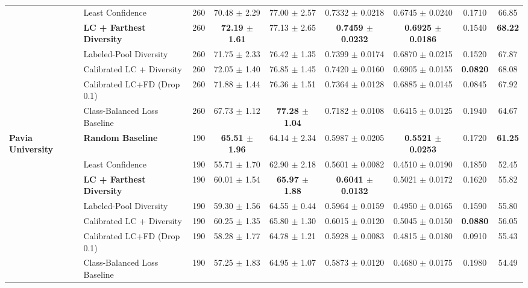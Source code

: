\documentclass[conference,letterpaper]{IEEEtran}
\begin{document}
\begin{table}[!t]
{\begin{tabular}{|l|l|c|c|c|c|c|c|c|}
& Least Confidence & 260 & 70.48 $\pm$ 2.29 & 77.00 $\pm$ 2.57 & 0.7332 $\pm$ 0.0218 & 0.6745 $\pm$ 0.0240 & 0.1710 & 66.85 \\
\cline{2-9}
& \textbf{LC + Farthest Diversity} & 260 & \textbf{72.19 $\pm$ 1.61} & 77.13 $\pm$ 2.65 & \textbf{0.7459 $\pm$ 0.0232} & \textbf{0.6925 $\pm$ 0.0186} & 0.1540 & \textbf{68.22} \\
\cline{2-9}
& Labeled-Pool Diversity & 260 & 71.75 $\pm$ 2.33 & 76.42 $\pm$ 1.35 & 0.7399 $\pm$ 0.0174 & 0.6870 $\pm$ 0.0215 & 0.1520 & 67.87 \\
\cline{2-9}
& Calibrated LC + Diversity & 260 & 72.05 $\pm$ 1.40 & 76.85 $\pm$ 1.45 & 0.7420 $\pm$ 0.0160 & 0.6905 $\pm$ 0.0155 & \textbf{0.0820} & 68.08 \\
\cline{2-9}
& Calibrated LC+FD (Drop 0.1) & 260 & 71.88 $\pm$ 1.44 & 76.36 $\pm$ 1.51 & 0.7364 $\pm$ 0.0128 & 0.6885 $\pm$ 0.0145 & 0.0845 & 67.92 \\
\cline{2-9}
& Class-Balanced Loss Baseline & 260 & 67.73 $\pm$ 1.12 & \textbf{77.28 $\pm$ 1.04} & 0.7182 $\pm$ 0.0108 & 0.6415 $\pm$ 0.0125 & 0.1940 & 64.67 \\
\hline
\hline
\multirow{7}{*}{\textbf{Pavia University}} 
& \textbf{Random Baseline} & 190 & \textbf{65.51 $\pm$ 1.96} & 64.14 $\pm$ 2.34 & 0.5987 $\pm$ 0.0205 & \textbf{0.5521 $\pm$ 0.0253} & 0.1720 & \textbf{61.25} \\
\cline{2-9}
& Least Confidence & 190 & 55.71 $\pm$ 1.70 & 62.90 $\pm$ 2.18 & 0.5601 $\pm$ 0.0082 & 0.4510 $\pm$ 0.0190 & 0.1850 & 52.45 \\
\cline{2-9}
& \textbf{LC + Farthest Diversity} & 190 & 60.01 $\pm$ 1.54 & \textbf{65.97 $\pm$ 1.88} & \textbf{0.6041 $\pm$ 0.0132} & 0.5021 $\pm$ 0.0172 & 0.1620 & 55.82 \\
\cline{2-9}
& Labeled-Pool Diversity & 190 & 59.30 $\pm$ 1.56 & 64.55 $\pm$ 0.44 & 0.5964 $\pm$ 0.0159 & 0.4950 $\pm$ 0.0165 & 0.1590 & 55.80 \\
\cline{2-9}
& Calibrated LC + Diversity & 190 & 60.25 $\pm$ 1.35 & 65.80 $\pm$ 1.30 & 0.6015 $\pm$ 0.0120 & 0.5045 $\pm$ 0.0150 & \textbf{0.0880} & 56.05 \\
\cline{2-9}
& Calibrated LC+FD (Drop 0.1) & 190 & 58.28 $\pm$ 1.77 & 64.78 $\pm$ 1.21 & 0.5928 $\pm$ 0.0083 & 0.4815 $\pm$ 0.0180 & 0.0910 & 55.43 \\
\cline{2-9}
& Class-Balanced Loss Baseline & 190 & 57.25 $\pm$ 1.83 & 64.95 $\pm$ 1.07 & 0.5873 $\pm$ 0.0120 & 0.4680 $\pm$ 0.0175 & 0.1980 & 54.49 \\
\hline
\end{tabular}%
}
\end{table}
\end{document}
